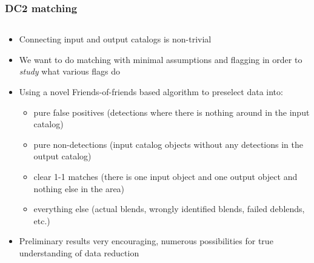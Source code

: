 \documentclass[aspectratio=169]{beamer}
\begin{document}
\begin{frame}
  \frametitle{DC2 matching}

  \begin{columns}
    \begin{column}{7.5cm}
      \begin{itemize}
      \item Connecting input and output catalogs is non-trivial
      
      \item We want to do matching with minimal assumptions and
        flagging in order to \emph{study} what various flags do

      \item Using a novel Friends-of-friends based algorithm to
        preselect data into:
        \begin{itemize}
          \scriptsize
        \item  pure false positives (detections where
        there is nothing around in the input catalog)

      \item pure non-detections (input catalog objects without any
         detections in the output catalog)

      \item clear 1-1 matches (there is one input object and one
        output object and nothing else in the area)

      \item everything else (actual blends, wrongly identified blends,
        failed deblends, etc.)


        \end{itemize}
      \item Preliminary results very encouraging, numerous
        possibilities for true understanding of data reduction


\end{itemize}
\end{column}
\end{columns}
\end{frame}
\end{document}
